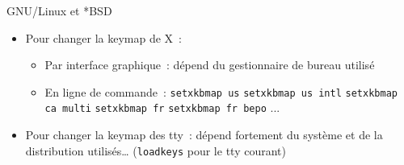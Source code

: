 \begin{frame}{GNU/Linux et *BSD}
    \begin{itemize}
        \item Pour changer la keymap de X~: \pause
            \begin{itemize}
                \item Par interface graphique~: dépend du gestionnaire de
                  bureau utilisé \pause

                \item En ligne de commande~:
                  \newline \texttt{setxkbmap us}
                  \newline \texttt{setxkbmap us intl}
                  \newline \texttt{setxkbmap ca multi}
                  \newline \texttt{setxkbmap fr}
                  \newline \texttt{setxkbmap fr bepo}
                  ...
            \end{itemize}
            \pause

        \item Pour changer la keymap des tty~: dépend fortement du système et
            de la distribution utilisés… (\texttt{loadkeys} pour le tty
            courant)\pause
    \end{itemize}
\end{frame}

